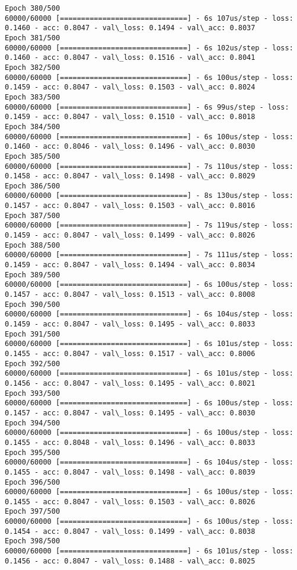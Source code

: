 \documentclass[11pt]{article}
\begin{document}
\begin{Verbatim}[commandchars=\\\{\}]
Epoch 380/500
60000/60000 [==============================] - 6s 107us/step - loss: 0.1460 - acc: 0.8047 - val\_loss: 0.1494 - val\_acc: 0.8037
Epoch 381/500
60000/60000 [==============================] - 6s 102us/step - loss: 0.1460 - acc: 0.8047 - val\_loss: 0.1516 - val\_acc: 0.8041
Epoch 382/500
60000/60000 [==============================] - 6s 100us/step - loss: 0.1459 - acc: 0.8047 - val\_loss: 0.1503 - val\_acc: 0.8024
Epoch 383/500
60000/60000 [==============================] - 6s 99us/step - loss: 0.1459 - acc: 0.8047 - val\_loss: 0.1510 - val\_acc: 0.8018
Epoch 384/500
60000/60000 [==============================] - 6s 100us/step - loss: 0.1460 - acc: 0.8046 - val\_loss: 0.1496 - val\_acc: 0.8030
Epoch 385/500
60000/60000 [==============================] - 7s 110us/step - loss: 0.1458 - acc: 0.8047 - val\_loss: 0.1498 - val\_acc: 0.8029
Epoch 386/500
60000/60000 [==============================] - 8s 130us/step - loss: 0.1457 - acc: 0.8047 - val\_loss: 0.1503 - val\_acc: 0.8016
Epoch 387/500
60000/60000 [==============================] - 7s 119us/step - loss: 0.1459 - acc: 0.8047 - val\_loss: 0.1499 - val\_acc: 0.8026
Epoch 388/500
60000/60000 [==============================] - 7s 111us/step - loss: 0.1459 - acc: 0.8047 - val\_loss: 0.1494 - val\_acc: 0.8034
Epoch 389/500
60000/60000 [==============================] - 6s 100us/step - loss: 0.1457 - acc: 0.8047 - val\_loss: 0.1513 - val\_acc: 0.8008
Epoch 390/500
60000/60000 [==============================] - 6s 104us/step - loss: 0.1459 - acc: 0.8047 - val\_loss: 0.1495 - val\_acc: 0.8033
Epoch 391/500
60000/60000 [==============================] - 6s 101us/step - loss: 0.1455 - acc: 0.8047 - val\_loss: 0.1517 - val\_acc: 0.8006
Epoch 392/500
60000/60000 [==============================] - 6s 101us/step - loss: 0.1456 - acc: 0.8047 - val\_loss: 0.1495 - val\_acc: 0.8021
Epoch 393/500
60000/60000 [==============================] - 6s 100us/step - loss: 0.1457 - acc: 0.8047 - val\_loss: 0.1495 - val\_acc: 0.8030
Epoch 394/500
60000/60000 [==============================] - 6s 100us/step - loss: 0.1455 - acc: 0.8048 - val\_loss: 0.1496 - val\_acc: 0.8033
Epoch 395/500
60000/60000 [==============================] - 6s 104us/step - loss: 0.1455 - acc: 0.8047 - val\_loss: 0.1498 - val\_acc: 0.8039
Epoch 396/500
60000/60000 [==============================] - 6s 100us/step - loss: 0.1455 - acc: 0.8047 - val\_loss: 0.1503 - val\_acc: 0.8026
Epoch 397/500
60000/60000 [==============================] - 6s 100us/step - loss: 0.1454 - acc: 0.8047 - val\_loss: 0.1499 - val\_acc: 0.8038
Epoch 398/500
60000/60000 [==============================] - 6s 101us/step - loss: 0.1456 - acc: 0.8047 - val\_loss: 0.1488 - val\_acc: 0.8025

\end{Verbatim}
\end{document}
